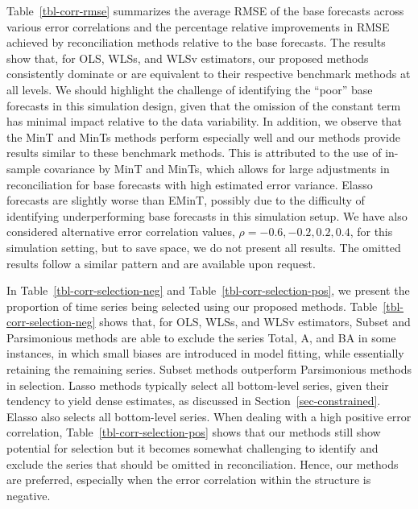 \documentclass[
  11pt]{article}
\theoremstyle{plain}
\theoremstyle{remark}
\begin{document}
Table~\ref{tbl-corr-rmse} summarizes the average RMSE of the base
forecasts across various error correlations and the percentage relative
improvements in RMSE achieved by reconciliation methods relative to the
base forecasts. The results show that, for OLS, WLSs, and WLSv
estimators, our proposed methods consistently dominate or are equivalent
to their respective benchmark methods at all levels. We should highlight
the challenge of identifying the ``poor'' base forecasts in this
simulation design, given that the omission of the constant term has
minimal impact relative to the data variability. In addition, we observe
that the MinT and MinTs methods perform especially well and our methods
provide results similar to these benchmark methods. This is attributed
to the use of in-sample covariance by MinT and MinTs, which allows for
large adjustments in reconciliation for base forecasts with high
estimated error variance. Elasso forecasts are slightly worse than
EMinT, possibly due to the difficulty of identifying underperforming
base forecasts in this simulation setup. We have also considered
alternative error correlation values, \(\rho = -0.6, -0.2, 0.2, 0.4\),
for this simulation setting, but to save space, we do not present all
results. The omitted results follow a similar pattern and are available
upon request.

In Table~\ref{tbl-corr-selection-neg} and
Table~\ref{tbl-corr-selection-pos}, we present the proportion of time
series being selected using our proposed methods.
Table~\ref{tbl-corr-selection-neg} shows that, for OLS, WLSs, and WLSv
estimators, Subset and Parsimonious methods are able to exclude the
series Total, A, and BA in some instances, in which small biases are
introduced in model fitting, while essentially retaining the remaining
series. Subset methods outperform Parsimonious methods in selection.
Lasso methods typically select all bottom-level series, given their
tendency to yield dense estimates, as discussed in
Section~\ref{sec-constrained}. Elasso also selects all bottom-level
series. When dealing with a high positive error correlation,
Table~\ref{tbl-corr-selection-pos} shows that our methods still show
potential for selection but it becomes somewhat challenging to identify
and exclude the series that should be omitted in reconciliation. Hence,
our methods are preferred, especially when the error correlation within
the structure is negative.
\end{document}

